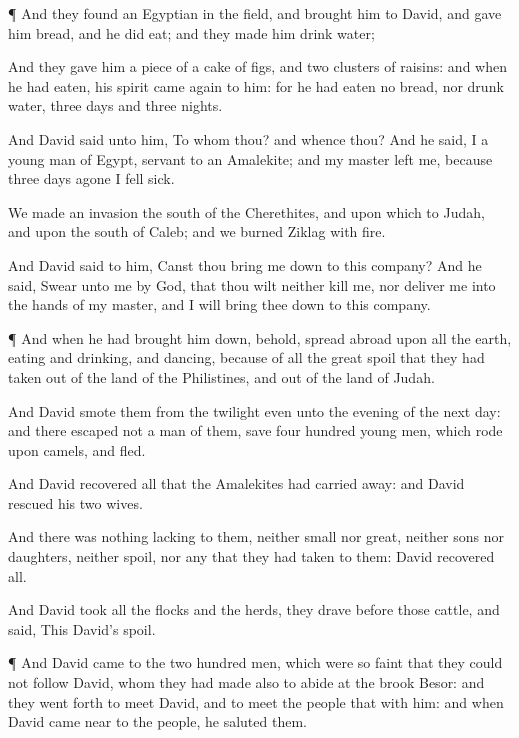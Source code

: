 {\par }{\PP {}¶ And they
found an
Egyptian in the
field, and
brought him to
David, and
gave him
bread, and he did
eat; and they made him
drink
water;

And they
gave him a
piece of a
cake of figs, and
two clusters of
raisins: and when he had
eaten, his
spirit came
again to him: for he had
eaten no
bread, nor
drunk
{}
water,
three
days and
three
nights.

And
David
said unto him, To whom
{} thou? and whence
{} thou? And he
said, I
{} a young
man of
Egypt,
servant to an
Amalekite; and my
master
left me, because
three
days agone I fell
sick.

We made an
invasion
{} the
south of the
Cherethites, and upon
{} which
{} to
Judah, and upon the
south of
Caleb; and we
burned
Ziklag with
fire.

And
David
said to him, Canst thou bring me
down to this
company? And he
said,
Swear unto me by
God, that thou wilt neither
kill me,
nor
deliver me into the
hands of my
master, and I will bring thee
down to this
company.


\par }{\PP {}¶ And when he had brought him
down, behold,
{} spread
abroad upon
all the
earth,
eating and
drinking, and
dancing, because of all the
great
spoil that they had
taken out of the
land of the
Philistines, and out of the
land of
Judah.

And
David
smote them from the
twilight even unto the
evening of the next
day: and there
escaped not a
man of them, save
four
hundred
young
men, which
rode upon
camels, and
fled.

And
David
recovered all that the
Amalekites had carried
away: and
David
rescued his
two
wives.

And there was nothing
lacking to them,
neither
small nor
great, neither
sons nor
daughters, neither
spoil, nor any
{} that they had
taken to them:
David
recovered all.

And
David
took all the
flocks and the
herds,
{} they
drave
before
those
{}
cattle, and
said, This
{}
David’s
spoil.


\par }{\PP {}¶ And
David
came to the two
hundred
men, which were so
faint that they could not
follow
David, whom they had made also to
abide at the
brook
Besor: and they went
forth to
meet
David, and to
meet the
people that
{} with him: and when
David came
near to the
people, he
saluted them.

}
